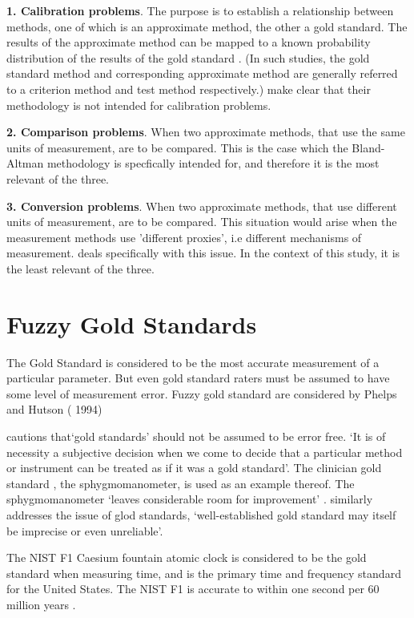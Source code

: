 \documentclass[12pt, a4paper]{report}
\theoremstyle{plain}
\theoremstyle{definition}
\theoremstyle{remark}
\begin{document}
\textbf{1. Calibration problems}. The purpose is to establish a
relationship between methods, one of which is an approximate
method, the other a gold standard. The results of the approximate
method can be mapped to a known probability distribution of the
results of the gold standard \citep{lewis}. (In such studies, the
gold standard method and corresponding approximate method are
generally referred to a criterion method and test method
respectively.) \citet*{BA83} make clear that their methodology is
not intended for calibration problems.

\bigskip \textbf{2. Comparison problems}. When two approximate
methods, that use the same units of measurement, are to be
compared. This is the case which the Bland-Altman methodology is
specfically intended for, and therefore it is the most relevant of
the three.



\bigskip \textbf{3. Conversion problems}. When two approximate
methods, that use different units of measurement, are to be
compared. This situation would arise when the measurement methods
use 'different proxies', i.e different mechanisms of measurement.
\citet{lewis} deals specifically with this issue. In the context
of this study, it is the least relevant of the three.

	\section{Fuzzy Gold Standards} The Gold Standard is considered to be the most
	accurate measurement of a particular parameter. But even gold
	standard raters must be assumed to have some level of measurement
	error. Fuzzy gold standard are considered by Phelps and Hutson (
	1994)
	
\citet[p.47]{DunnSEME} cautions that`gold standards' should not be
assumed to be error free. `It is of necessity a subjective
decision when we come to decide that a particular method or
instrument can be treated as if it was a gold standard'. The
clinician gold standard , the sphygmomanometer, is used as an
example thereof.  The sphygmomanometer `leaves considerable room
for improvement' \citep{DunnSEME}. \citet{pizzi} similarly
addresses the issue of glod standards, `well-established gold
standard may itself be imprecise or even unreliable'.


The NIST F1 Caesium fountain atomic clock is considered to be the
gold standard when measuring time, and is the primary time and
frequency standard for the United States. The NIST F1 is accurate
to within one second per 60 million years \citep{NIST}.
\end{document}
